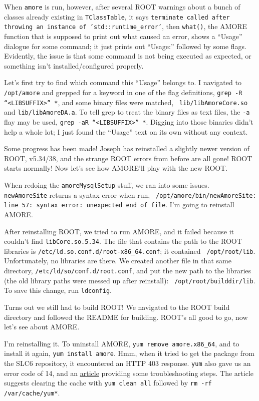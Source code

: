 \documentclass[12pt]{article}
\begin{document}
\qq When {\tt amore} is run, however, after several ROOT warnings about a bunch
of classes already existing in {\tt TClassTable}, it says {\tt terminate called
  after throwing an instance of 'std::runtime\_error'}, then {\tt what()}, the
AMORE function that is supposed to print out what caused an error, shows a
``Usage'' dialogue for some command; it just prints out ``Usage:'' followed by
some flags. Evidently, the issue is that some command
is not being executed as expected, or something isn't installed/configured
properly.

\qq Let's first try to find which command this ``Usage'' belongs to. I navigated
to {\tt /opt/amore} and grepped for a keyword in one of the flag definitions,
{\tt grep -R ``<LIBSUFFIX>'' *}, and some binary files were matched, {\tt
  lib/libAmoreCore.so} and {\tt lib/libAmoreDA.a}. To tell grep to treat the
binary files as text files, the {\tt -a} flay may be used, {\tt grep -aR
  ``<LIBSUFFIX>'' *}. Digging into those binaries didn't help a whole lot; I
just found the ``Usage'' text on its own without any context.

\qq Some progress has been made! Joseph has reinstalled a slightly newer version
of ROOT, v5.34/38, and the strange ROOT errors from before are all gone! ROOT
starts normally! Now let's see how AMORE'll play with the new ROOT.

\qq When redoing the {\tt amoreMysqlSetup} stuff, we ran into some issues. {\tt
  newAmoreSite} returns a syntax error when run, {\tt
  /opt/amore/bin/newAmoreSite: line 57: syntax error: unexpected end of file}.
I'm going to reinstall AMORE.

\qq After reinstalling ROOT, we tried to run AMORE, and it failed because it
couldn't find {\tt libCore.so.5.34}. The file that contains the path to the ROOT
libraries is {\tt /etc/ld.so.conf.d/root-x86\_64.conf}; it contained {\tt
  /opt/root/lib}. Unfortunately, no libraries are there. We created another file
in that same directory, {\tt /etc/ld/so/conf.d/root.conf}, and put the new path
to the libraries (the old library paths were messed up after reinstall): {\tt
  /opt/root/builddir/lib}. To save this change, run {\tt ldconfig}.

\qq Turns out we still had to build ROOT! We navigated to the ROOT build
directory and followed the README for building. ROOT's all good to go, now let's
see about AMORE. 

\qq I'm reinstalling it. To uninstall AMORE, {\tt yum remove amore.x86\_64}, and
to install it again, {\tt yum install amore}. Hmm, when it tried to get the
package from the SLC6 repository, it encountered an HTTP 403 response. {\tt yum}
also gave us an error code of 14, and an
\href{https://wiki.centos.org/yum-errors}{\underline{article}} providing some
troubleshooting steps. The article suggests clearing the cache with {\tt yum
  clean all} followed by {\tt rm -rf /var/cache/yum*}.
\end{document}
